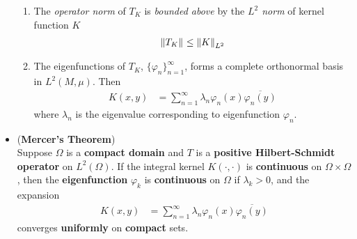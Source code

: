 \documentclass[11pt]{article}
\begin{document}
\begin{itemize}
\begin{remark}
\begin{enumerate}
\item The \emph{operator norm} of $T_K$ is \emph{bounded above} by the \emph{$L^2$ norm} of kernel function $K$
\begin{align*}
\left\|T_K\right\|_{} \le \left\|K\right\|_{L^2}
\end{align*}

\item The eigenfunctions of $T_K$, $\{\varphi_n\}_{n=1}^{\infty}$, forms a complete orthonormal basis in $L^2(M, \mu)$. Then 
\begin{align*}
K(x,y) &= \sum_{n=1}^{\infty}\lambda_{n}\varphi_n(x)\overline{\varphi_n(y)}
\end{align*} where $\lambda_n$ is the eigenvalue corresponding to eigenfunction $\varphi_n$.
\end{enumerate}
\end{remark}


\item \begin{theorem}  (\textbf{Mercer's Theorem}) \\
Suppose $\Omega$ is a \textbf{compact domain} and $T$ is a \textbf{positive Hilbert-Schmidt operator} on $L^2(\Omega)$. If the integral kernel $K(\cdot, \cdot)$ is
\textbf{continuous} on $\Omega \times \Omega$, then the \textbf{eigenfunction} $\varphi_k$ is \textbf{continuous} on $\Omega$ if $\lambda_k > 0$, and
the expansion
\begin{align*}
K(x,y) &= \sum_{n=1}^{\infty}\lambda_{n}\varphi_n(x)\overline{\varphi_n(y)}
\end{align*}
converges \textbf{uniformly} on \textbf{compact} sets.
\end{theorem}


\end{itemize}
\end{document}
